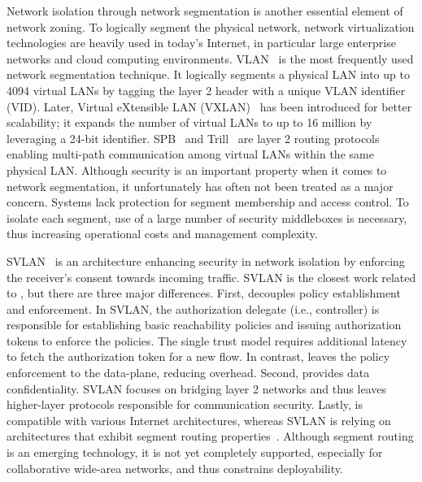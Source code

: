 Network isolation through network segmentation is another essential element of
network zoning. To logically segment the physical network, network
virtualization technologies are heavily used in today's Internet, in particular
large enterprise networks and cloud computing environments.
VLAN~\cite{ieee2018vlan} is the most frequently used network segmentation
technique. It logically segments a physical LAN into up to 4094 virtual LANs by
tagging the layer 2 header with a unique VLAN identifier (VID). Later, Virtual
eXtensible LAN (VXLAN)~\cite{rfc7348} has been introduced for better
scalability; it expands the number of virtual LANs to up to 16 million by
leveraging a 24-bit identifier. SPB~\cite{ieee2012spb} and
Trill~\cite{rfc6325,rfc7176} are layer 2 routing protocols enabling multi-path
communication among virtual LANs within the same physical LAN. Although security
is an important property when it comes to network segmentation, it unfortunately
has often not been treated as a major concern. Systems lack protection for
segment membership and access control. To isolate each segment, use of a large
number of security middleboxes is necessary, thus increasing operational costs
and management complexity.

SVLAN~\cite{kwon2020svlan} is an architecture enhancing security in network
isolation by enforcing the receiver's consent towards incoming traffic. SVLAN is
the closest work related to \name, but there are three major differences. First,
\name decouples policy establishment and enforcement. In SVLAN, the
authorization delegate (i.e., controller) is responsible for establishing basic
reachability policies and issuing authorization tokens to enforce the policies.
The single trust model requires additional latency to fetch the authorization
token for a new flow. In contrast, \name leaves the policy enforcement to the
data-plane, reducing overhead. Second, \name provides data confidentiality.
SVLAN focuses on bridging layer 2 networks and thus leaves higher-layer
protocols responsible for communication security. Lastly, \name is compatible
with various Internet architectures, whereas SVLAN is relying on architectures
that exhibit segment routing properties~\cite{rfc8402,rfc8660,Perrig2017}.
Although segment routing is an emerging technology, it is not yet completely
supported, especially for collaborative wide-area networks, and thus constrains
deployability.

